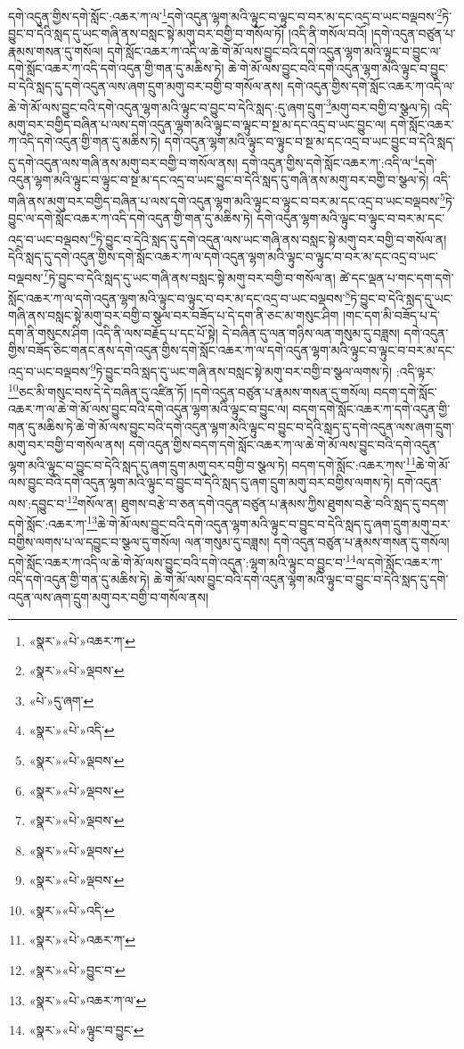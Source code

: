 དགེ་འདུན་གྱིས་དགེ་སློང་:འཆར་ཀ་ལ་\footnote{«སྣར་»«པེ་»འཆར་ཀ་}དགེ་འདུན་ལྷག་མའི་ལྟུང་བ་ལྟུང་བ་བར་མ་དང་འདྲ་བ་ཡང་བལྡབས་\footnote{«སྣར་»«པེ་»ལྡབས་}ཏེ་བྱུང་བ་དེའི་སླད་དུ་ཡང་གཞི་ནས་བསླང་སྟེ་མགུ་བར་བགྱི་བ་གསོལ་ཏོ། །འདི་ནི་གསོལ་བའོ། །དགེ་འདུན་བཙུན་པ་རྣམས་གསན་དུ་གསོལ། དགེ་སློང་འཆར་ཀ་འདི་ལ་ཆེ་གེ་མོ་ལས་བྱུང་བའི་དགེ་འདུན་ལྷག་མའི་ལྟུང་བ་བྱུང་ལ་དགེ་སློང་འཆར་ཀ་འདི་དགེ་འདུན་གྱི་གན་དུ་མཆིས་ཏེ། ཆེ་གེ་མོ་ལས་བྱུང་བའི་དགེ་འདུན་ལྷག་མའི་ལྟུང་བ་བྱུང་བ་དེའི་སླད་དུ་དགེ་འདུན་ལས་ཞག་དྲུག་མགུ་བར་བགྱི་བ་གསོལ་ནས། དགེ་འདུན་གྱིས་དགེ་སློང་འཆར་ཀ་འདི་ལ་ཆེ་གེ་མོ་ལས་བྱུང་བའི་དགེ་འདུན་ལྷག་མའི་ལྟུང་བ་བྱུང་བ་དེའི་སླད་:དུ་ཞག་དྲུག་\footnote{«པེ་»དུ་ཞག་}མགུ་བར་བགྱི་བ་སྩལ་ཏེ། འདི་མགུ་བར་བགྱིད་བཞིན་པ་ལས་དགེ་འདུན་ལྷག་མའི་ལྟུང་བ་ལྟུང་བ་སྔ་མ་དང་འདྲ་བ་ཡང་བྱུང་ལ། དགེ་སློང་འཆར་ཀ་འདི་དགེ་འདུན་གྱི་གན་དུ་མཆིས་ཏེ། དགེ་འདུན་ལྷག་མའི་ལྟུང་བ་ལྟུང་བ་སྔ་མ་དང་འདྲ་བ་ཡང་བྱུང་བ་དེའི་སླད་དུ་དགེ་འདུན་ལས་གཞི་ནས་མགུ་བར་བགྱི་བ་གསོལ་ནས། དགེ་འདུན་གྱིས་དགེ་སློང་འཆར་ཀ་:འདི་ལ་\footnote{«སྣར་»«པེ་»འདི་}དགེ་འདུན་ལྷག་མའི་ལྟུང་བ་ལྟུང་བ་སྔ་མ་དང་འདྲ་བ་ཡང་བྱུང་བ་དེའི་སླད་དུ་གཞི་ནས་མགུ་བར་བགྱི་བ་སྩལ་ཏེ། འདི་གཞི་ནས་མགུ་བར་བགྱིད་བཞིན་པ་ལས་དགེ་འདུན་ལྷག་མའི་ལྟུང་བ་ལྟུང་བ་བར་མ་དང་འདྲ་བ་ཡང་བལྡབས་\footnote{«སྣར་»«པེ་»ལྡབས་}ཏེ་བྱུང་ལ་དགེ་སློང་འཆར་ཀ་འདི་དགེ་འདུན་གྱི་གན་དུ་མཆིས་ཏེ། དགེ་འདུན་ལྷག་མའི་ལྟུང་བ་ལྟུང་བ་བར་མ་དང་འདྲ་བ་ཡང་བལྡབས་\footnote{«སྣར་»«པེ་»ལྡབས་}ཏེ་བྱུང་བ་དེའི་སླད་དུ་དགེ་འདུན་ལས་ཡང་གཞི་ནས་བསླང་སྟེ་མགུ་བར་བགྱི་བ་གསོལ་ན། དེའི་སླད་དུ་དགེ་འདུན་གྱིས་དགེ་སློང་འཆར་ཀ་ལ་དགེ་འདུན་ལྷག་མའི་ལྟུང་བ་ལྟུང་བ་བར་མ་དང་འདྲ་བ་ཡང་བལྡབས་\footnote{«སྣར་»«པེ་»ལྡབས་}ཏེ་བྱུང་བ་དེའི་སླད་དུ་ཡང་གཞི་ནས་བསླང་སྟེ་མགུ་བར་བགྱི་བ་གསོལ་ན། ཚེ་དང་ལྡན་པ་གང་དག་དགེ་སློང་འཆར་ཀ་ལ་དགེ་འདུན་ལྷག་མའི་ལྟུང་བ་ལྟུང་བ་བར་མ་དང་འདྲ་བ་ཡང་བལྡབས་\footnote{«སྣར་»«པེ་»ལྡབས་}ཏེ་བྱུང་བ་དེའི་སླད་དུ་ཡང་གཞི་ནས་བསླང་སྟེ་མགུ་བར་བགྱི་བ་སྩལ་བར་བཟོད་པ་དེ་དག་ནི་ཅང་མ་གསུང་ཤིག །གང་དག་མི་བཟོད་པ་དེ་དག་ནི་གསུངས་ཤིག །འདི་ནི་ལས་བརྗོད་པ་དང་པོ་སྟེ། དེ་བཞིན་དུ་ལན་གཉིས་ལན་གསུམ་དུ་བཟླས། དགེ་འདུན་གྱིས་བཟོད་ཅིང་གནང་ནས་དགེ་འདུན་གྱིས་དགེ་སློང་འཆར་ཀ་ལ་དགེ་འདུན་ལྷག་མའི་ལྟུང་བ་ལྟུང་བ་བར་མ་དང་འདྲ་བ་ཡང་བལྡབས་\footnote{«སྣར་»«པེ་»ལྡབས་}ཏེ་བྱུང་བའི་སླད་དུ་ཡང་གཞི་ནས་བསླང་སྟེ་མགུ་བར་བགྱི་བ་སྩལ་ལགས་ཏེ། :འདི་ལྟར་\footnote{«སྣར་»«པེ་»འདི་}ཅང་མི་གསུང་བས་དེ་དེ་བཞིན་དུ་འཛིན་ཏོ། །དགེ་འདུན་བཙུན་པ་རྣམས་གསན་དུ་གསོལ། བདག་དགེ་སློང་འཆར་ཀ་ལ་ཆེ་གེ་མོ་ལས་བྱུང་བའི་དགེ་འདུན་ལྷག་མའི་ལྟུང་བ་བྱུང་ལ། བདག་དགེ་སློང་འཆར་ཀ་དགེ་འདུན་གྱི་གན་དུ་མཆིས་ཏེ་ཆེ་གེ་མོ་ལས་བྱུང་བའི་དགེ་འདུན་ལྷག་མའི་ལྟུང་བ་བྱུང་བ་དེའི་སླད་དུ་དགེ་འདུན་ལས་ཞག་དྲུག་མགུ་བར་བགྱི་བ་གསོལ་ནས། དགེ་འདུན་གྱིས་བདག་དགེ་སློང་འཆར་ཀ་ལ་ཆེ་གེ་མོ་ལས་བྱུང་བའི་དགེ་འདུན་ལྷག་མའི་ལྟུང་བ་བྱུང་བ་དེའི་སླད་དུ་ཞག་དྲུག་མགུ་བར་བགྱི་བ་སྩལ་ཏེ། བདག་དགེ་སློང་:འཆར་ཀས་\footnote{«སྣར་»«པེ་»འཆར་ཀ་}ཆེ་གེ་མོ་ལས་བྱུང་བའི་དགེ་འདུན་ལྷག་མའི་ལྟུང་བ་བྱུང་བ་དེའི་སླད་དུ་ཞག་དྲུག་མགུ་བར་བགྱིས་ལགས་ཏེ། དགེ་འདུན་ལས་:དབྱུང་བ་\footnote{«སྣར་»«པེ་»བྱུང་བ་}གསོལ་ན། ཐུགས་བརྩེ་བ་ཅན་དགེ་འདུན་བཙུན་པ་རྣམས་ཀྱིས་ཐུགས་བརྩེ་བའི་སླད་དུ་བདག་དགེ་སློང་:འཆར་ཀ་\footnote{«སྣར་»«པེ་»འཆར་ཀ་ལ་}ཆེ་གེ་མོ་ལས་བྱུང་བའི་དགེ་འདུན་ལྷག་མའི་ལྟུང་བ་བྱུང་བ་དེའི་སླད་དུ་ཞག་དྲུག་མགུ་བར་བགྱིས་ལགས་པ་ལ་དབྱུང་བ་སྩལ་དུ་གསོལ། ལན་གསུམ་དུ་བཟླས། དགེ་འདུན་བཙུན་པ་རྣམས་གསན་དུ་གསོལ། དགེ་སློང་འཆར་ཀ་འདི་ལ་ཆེ་གེ་མོ་ལས་བྱུང་བའི་དགེ་འདུན་:ལྷག་མའི་ལྟུང་བ་བྱུང་བ་\footnote{«སྣར་»«པེ་»ལྟུང་བ་བྱུང་}ལ་དགེ་སློང་འཆར་ཀ་འདི་དགེ་འདུན་གྱི་གན་དུ་མཆིས་ཏེ། ཆེ་གེ་མོ་ལས་བྱུང་བའི་དགེ་འདུན་ལྷག་མའི་ལྟུང་བ་བྱུང་བ་དེའི་སླད་དུ་དགེ་འདུན་ལས་ཞག་དྲུག་མགུ་བར་བགྱི་བ་གསོལ་ནས། 